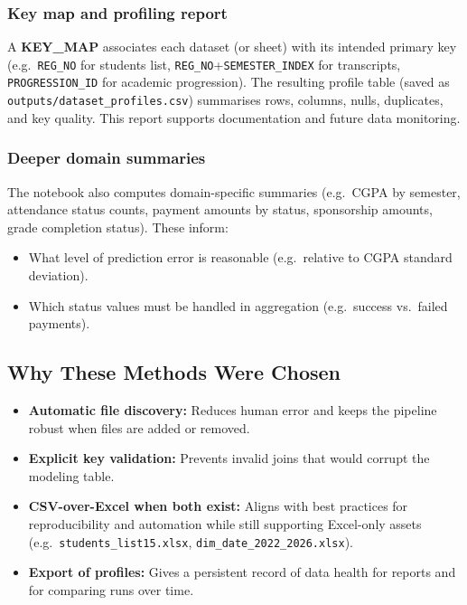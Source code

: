 \documentclass[12pt,a4paper]{article}
\begin{document}
\subsubsection{Key map and profiling report}

A \textbf{KEY\_MAP} associates each dataset (or sheet) with its intended primary key (e.g.\ \texttt{REG\_NO} for students list, \texttt{REG\_NO}+\texttt{SEMESTER\_INDEX} for transcripts, \texttt{PROGRESSION\_ID} for academic progression). The resulting profile table (saved as \texttt{outputs/dataset\_profiles.csv}) summarises rows, columns, nulls, duplicates, and key quality. This report supports documentation and future data monitoring.

\subsubsection{Deeper domain summaries}

The notebook also computes domain-specific summaries (e.g.\ CGPA by semester, attendance status counts, payment amounts by status, sponsorship amounts, grade completion status). These inform:

\begin{itemize}[leftmargin=*]
  \item What level of prediction error is reasonable (e.g.\ relative to CGPA standard deviation).
  \item Which status values must be handled in aggregation (e.g.\ success vs.\ failed payments).
\end{itemize}

\subsection{Why These Methods Were Chosen}

\begin{itemize}[leftmargin=*]
  \item \textbf{Automatic file discovery:} Reduces human error and keeps the pipeline robust when files are added or removed.
  \item \textbf{Explicit key validation:} Prevents invalid joins that would corrupt the modeling table.
  \item \textbf{CSV-over-Excel when both exist:} Aligns with best practices for reproducibility and automation while still supporting Excel-only assets (e.g.\ \texttt{students\_list15.xlsx}, \texttt{dim\_date\_2022\_2026.xlsx}).
  \item \textbf{Export of profiles:} Gives a persistent record of data health for reports and for comparing runs over time.
\end{itemize}
\end{document}

